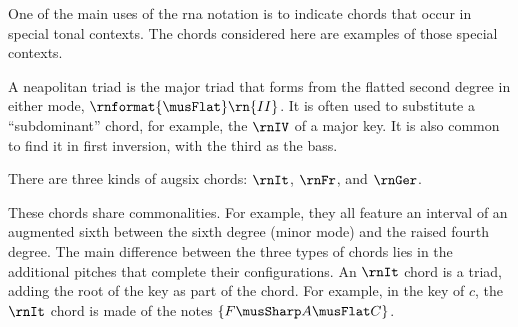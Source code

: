 
One of the main uses of the \gls{rna} notation is to
indicate chords that occur in special tonal contexts. The
chords considered here are examples of those special
contexts.


A \gls{neapolitan} triad is the major triad that forms from
the flatted second degree in either mode,
$\rnformat{\musFlat}\rn{II}$. It is often used to substitute
a ``subdominant'' chord, for example, the $\rnIV$ of a major
key. It is also common to find it in first inversion, with
the third as the bass.


There are three kinds of \gls{augsix} chords: $\rnIt$,
$\rnFr$, and $\rnGer$.

These chords share commonalities. For example, they all
feature an interval of an augmented sixth between the sixth
degree (minor mode) and the raised fourth degree. The main
difference between the three types of chords lies in the
additional pitches that complete their configurations. An
$\rnIt$ chord is a triad, adding the root of the key as part
of the chord. For example, in the key of $c$, the $\rnIt$
chord is made of the notes $\{F\musSharp A\musFlat C\}$.
